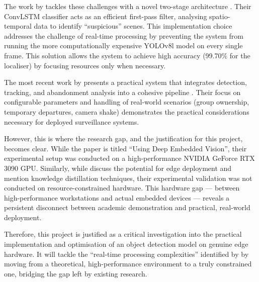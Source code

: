 The work by \citeauthor{qasim2024abandoned} tackles these challenges with a
novel two-stage architecture \citep{qasim2024abandoned}. Their ConvLSTM
classifier acts as an efficient first-pass filter, analysing spatio-temporal
data to identify \enquote{suspicious} scenes. This implementation choice
addresses the challenge of real-time processing by preventing the system from
running the more computationally expensive YOLOv8l model on every single frame.
This solution allows the system to achieve high accuracy (99.70\% for the
localiser) by focusing resources only when necessary.

The most recent work by \citeauthor{abandoned2025vrsalovic} presents a
practical system that integrates detection, tracking, and abandonment analysis
into a cohesive pipeline \citep{abandoned2025vrsalovic}. Their focus on
configurable parameters and handling of real-world scenarios (group ownership,
temporary departures, camera shake) demonstrates the practical considerations
necessary for deployed surveillance systems.

However, this is where the research gap, and the justification for this
project, becomes clear. While the \citeauthor{qasim2024abandoned} paper is
titled \enquote{Using Deep Embedded Vision}, their experimental setup was
conducted on a high-performance NVIDIA GeForce RTX 3090 GPU. Similarly, while
\citeauthor{abandoned2025vrsalovic} discuss the potential for edge deployment
and mention knowledge distillation techniques, their experimental validation
was not conducted on resource-constrained hardware. This hardware gap ---
between high-performance workstations and actual embedded devices --- reveals a
persistent disconnect between academic demonstration and practical, real-world
deployment.

Therefore, this project is justified as a critical investigation into the
practical implementation and optimisation of an object detection model on
genuine edge hardware. It will tackle the \enquote{real-time processing
	complexities} identified by \citeauthor{dubey2024critical} by moving from a
theoretical, high-performance environment to a truly constrained one, bridging
the gap left by existing research.

